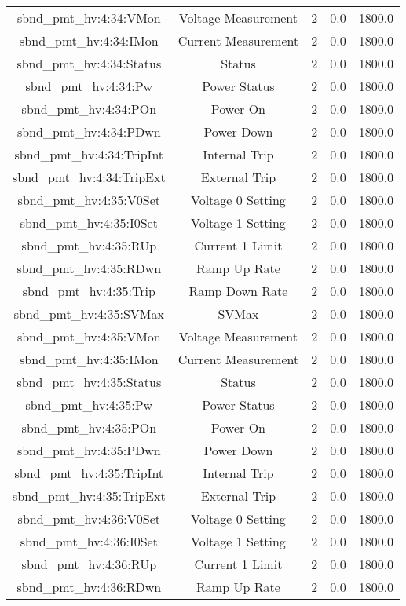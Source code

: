 \begin{center}
\begin{longtable}{c | c c c c }
sbnd\_pmt\_hv:4:34:VMon & Voltage Measurement & 2 & 0.0 & 1800.0\\ 
sbnd\_pmt\_hv:4:34:IMon & Current Measurement & 2 & 0.0 & 1800.0\\ 
sbnd\_pmt\_hv:4:34:Status & Status & 2 & 0.0 & 1800.0\\ 
sbnd\_pmt\_hv:4:34:Pw & Power Status & 2 & 0.0 & 1800.0\\ 
sbnd\_pmt\_hv:4:34:POn & Power On & 2 & 0.0 & 1800.0\\ 
sbnd\_pmt\_hv:4:34:PDwn & Power Down & 2 & 0.0 & 1800.0\\ 
sbnd\_pmt\_hv:4:34:TripInt & Internal Trip & 2 & 0.0 & 1800.0\\ 
sbnd\_pmt\_hv:4:34:TripExt & External Trip & 2 & 0.0 & 1800.0\\ 
sbnd\_pmt\_hv:4:35:V0Set & Voltage 0 Setting & 2 & 0.0 & 1800.0\\ 
sbnd\_pmt\_hv:4:35:I0Set & Voltage 1 Setting & 2 & 0.0 & 1800.0\\ 
sbnd\_pmt\_hv:4:35:RUp & Current 1 Limit & 2 & 0.0 & 1800.0\\ 
sbnd\_pmt\_hv:4:35:RDwn & Ramp Up Rate & 2 & 0.0 & 1800.0\\ 
sbnd\_pmt\_hv:4:35:Trip & Ramp Down Rate & 2 & 0.0 & 1800.0\\ 
sbnd\_pmt\_hv:4:35:SVMax & SVMax & 2 & 0.0 & 1800.0\\ 
sbnd\_pmt\_hv:4:35:VMon & Voltage Measurement & 2 & 0.0 & 1800.0\\ 
sbnd\_pmt\_hv:4:35:IMon & Current Measurement & 2 & 0.0 & 1800.0\\ 
sbnd\_pmt\_hv:4:35:Status & Status & 2 & 0.0 & 1800.0\\ 
sbnd\_pmt\_hv:4:35:Pw & Power Status & 2 & 0.0 & 1800.0\\ 
sbnd\_pmt\_hv:4:35:POn & Power On & 2 & 0.0 & 1800.0\\ 
sbnd\_pmt\_hv:4:35:PDwn & Power Down & 2 & 0.0 & 1800.0\\ 
sbnd\_pmt\_hv:4:35:TripInt & Internal Trip & 2 & 0.0 & 1800.0\\ 
sbnd\_pmt\_hv:4:35:TripExt & External Trip & 2 & 0.0 & 1800.0\\ 
sbnd\_pmt\_hv:4:36:V0Set & Voltage 0 Setting & 2 & 0.0 & 1800.0\\ 
sbnd\_pmt\_hv:4:36:I0Set & Voltage 1 Setting & 2 & 0.0 & 1800.0\\ 
sbnd\_pmt\_hv:4:36:RUp & Current 1 Limit & 2 & 0.0 & 1800.0\\ 
sbnd\_pmt\_hv:4:36:RDwn & Ramp Up Rate & 2 & 0.0 & 1800.0\\ 

\end{longtable}
\end{center}
